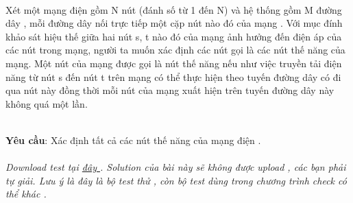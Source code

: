  

Xét một mạng điện gồm N nút (đánh số từ 1 đến N) và hệ thống gồm M đường dây , mỗi đường dây nối trực tiếp một cặp nút nào đó của mạng . Với mục đính khảo sát hiệu thế giữa hai nút s, t nào đó của mạng ảnh hưởng đến điện áp của các nút trong mạng, người ta muốn xác định các nút gọi là các nút thế năng của mạng. Một nút của mạng được gọi là nút thế năng nếu như việc truyền tải điện năng từ nút s đến nút t trên mạng có thể thực hiện theo tuyến đường dây có đi qua nút này đồng thời mỗi nút của mạng xuất hiện trên tuyến đường dây này không quá một lần.


\\\textbf{Yêu cầu}: Xác định tất cả các nút thế năng của mạng điện .
\\
\\\emph{Download test tại \href{http://vn.spoj.pl/content/ENET.rar}{ đây } . Solution của bài này sẽ không được upload , các bạn phải tự giải. Lưu ý là đây là bộ test thử , còn bộ test dùng trong chương trình check có thể khác . }

\